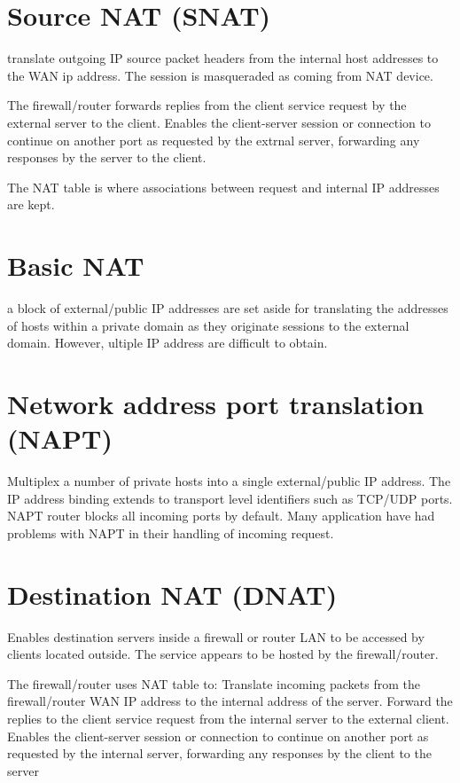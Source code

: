 \section{Source NAT (SNAT)}
translate outgoing IP source packet headers from the internal host addresses to the WAN ip address. The session
is masqueraded as coming from NAT device.

The firewall/router forwards replies from the client service request by the external server to the client. Enables the client-server session or connection to continue
on another port as requested by the extrnal server, forwarding any responses by the server to the client.

The NAT table is where associations between request and internal IP addresses are kept.

\section{Basic NAT}
a block of external/public IP addresses are set aside for translating the addresses of hosts within a private domain as they originate sessions to the external domain. 
However, ultiple IP address are difficult to obtain.

\section{Network address port translation (NAPT)}
Multiplex a number of private hosts into a single external/public IP address.
The IP address binding extends to transport level identifiers such as TCP/UDP ports.
NAPT router blocks all incoming ports by default. Many application have had problems with NAPT in their handling of incoming request.

\section{Destination NAT (DNAT)}
Enables destination servers inside a firewall or router LAN to be accessed by clients located outside.
The service appears to be hosted by the firewall/router.

The firewall/router uses NAT table to: Translate incoming packets from
the firewall/router WAN IP address
to the internal address of the
server. Forward the replies to the client
service request from the internal
server to the external client. Enables the client-server session
or connection to continue on
another port as requested by the
internal server, forwarding any
responses by the client to the
server 


